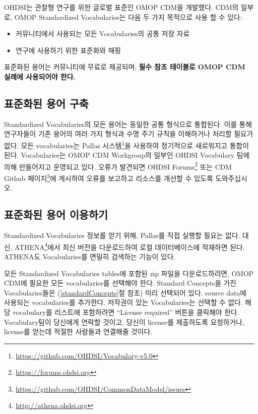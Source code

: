 \documentclass[11pt]{book}
\providecommand{\tightlist}{%
  \setlength{\itemsep}{0pt}\setlength{\parskip}{0pt}}
\let\rmarkdownfootnote\footnote%
\def\footnote{\protect\rmarkdownfootnote}
\theoremstyle{definition}
\theoremstyle{definition}
\theoremstyle{definition}
\theoremstyle{remark}
\begin{document}
OHDSI는 관찰형 연구를 위한 글로벌 표준인 OMOP CDM을 개발했다. CDM의
일부로, OMOP Standardized Vocabularies는 다음 두 가지 목적으로 사용 할
수 있다:

\begin{itemize}
\tightlist
\item
  커뮤니티에서 사용되는 모든 Vocabularies의 공통 저장 자료
\item
  연구에 사용하기 위한 표준화와 매핑
\end{itemize}

표준화된 용어는 커뮤니티에 무료로 제공되며, \textbf{필수 참조 테이블로
OMOP CDM 실례에 사용되어야 한다.}

\subsection{표준화된 용어 구축}\label{--}

Standardized Vocabularies의 모든 용어는 동일한 공통 형식으로 통합된다.
이를 통해 연구자들이 기존 용어의 여러 가지 형식과 수명 주기 규칙을
이해하거나 처리할 필요가 없다. 모든 vocabularies는 Pallas
시스템\footnote{\url{https://github.com/OHDSI/Vocabulary-v5.0}}을
사용하여 정기적으로 새로워지고 통합이 된다. Vocabularies는 OMOP CDM
Workgroup의 일부인 OHDSI Vocabulary 팀에 의해 만들어지고 운영되고 있다.
오류가 발견되면 OHDSI Forums\footnote{\url{https://forums.ohdsi.org}}
또는 CDM Github 페이지\footnote{\url{https://github.com/OHDSI/CommonDataModel/issues}}에
게시하여 오류를 보고하고 리소스를 개선할 수 있도록
도와주십시오.

\subsection{표준화된 용어 이용하기}\label{accessVocabularies}

Standardized Vocabularies 정보를 얻기 위해, Pallas를 직접 실행할 필요는
없다. 대신, ATHENA\footnote{\url{http://athena.ohdsi.org}}에서 최신
버전을 다운로드하여 로컬 데이터베이스에 적재하면 된다. ATHENA도
Vocabularies를 면밀히 검색하는 기능이 있다. 

모든 Standardized Vocabularies tables에 포함된 zip 파일을
다운로드하려면, OMOP CDM에 필요한 모든 vocabularies를 선택해야 한다.
Standard Concepts을 가진 Vocabularies들은 (\ref{standardConcepts}절
참조) 미리 선택되어 있다. source data에 사용되는 vocabularies를
추가한다. 저작권이 있는 Vocabularies는 선택할 수 없다. 해당 vocabulary를
리스트에 포함하려면 ``License required'' 버튼을 클릭해야 한다.
Vocabulary팀이 당신에게 연락할 것이고, 당신이 license를 제출하도록
요청하거나, license를 얻는데 적절한 사람들과 연결해줄 것이다.
\end{document}
